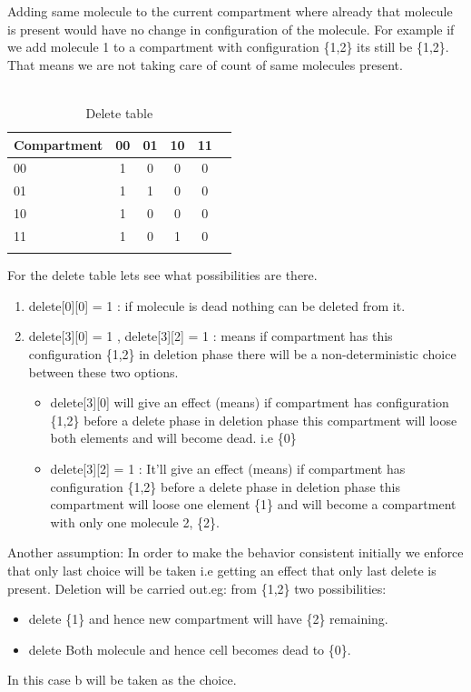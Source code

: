 \documentclass[preprint,12pt]{elsarticle}
\begin{document}
 Adding same molecule to the current compartment where already that molecule is present would have no change in configuration of the molecule. For example if we add molecule 1 to a compartment with configuration \{1,2\} its still be \{1,2\}. That means we are not taking care of count of same molecules present.\\\\
     
\begin{table}[]
\centering       
\label{my-label}
\begin{tabular}{l*{4}{c}r}
Compartment  & 00 & 01 & 10 & 11  \\
\hline
00 & 1 & 0 & 0 & 0     \\
01            & 1 & 1 & 0 & 0     \\
10           & 1 & 0 & 0 & 0     \\
11     & 1 & 0 & 1 & 0     \\ \\ 
\end{tabular}
\caption{Delete table}
\end{table}

For the delete table lets see what possibilities are there.
\begin{enumerate}
\item delete[0][0] = 1 : if molecule is dead nothing can be deleted from it.
\item delete[3][0] = 1 , delete[3][2] = 1 : means if compartment has this configuration \{1,2\} in deletion phase there will be a non-deterministic choice between these two options.
\begin{itemize}
\item delete[3][0] will give an effect (means) if compartment has configuration \{1,2\} before a delete phase in deletion phase this compartment will loose both elements and will become dead. i.e \{0\}
\item  delete[3][2] = 1 : It’ll give an effect (means) if compartment has configuration \{1,2\} before a delete phase in deletion phase this compartment will loose one element \{1\} and will become a compartment with only one molecule 2, \{2\}.
\end{itemize}
\end{enumerate}
 
Another assumption: In order to make the behavior consistent initially we enforce that only last choice will be taken i.e getting an effect that only last delete is present. Deletion will be carried out.eg: from \{1,2\} two possibilities:
\begin{itemize}
\item delete \{1\} and hence new compartment will have \{2\} remaining.
\item delete Both molecule and hence cell becomes dead to \{0\}.
\end{itemize}
 In this case b will be taken as the choice. 
 
\end{document}
